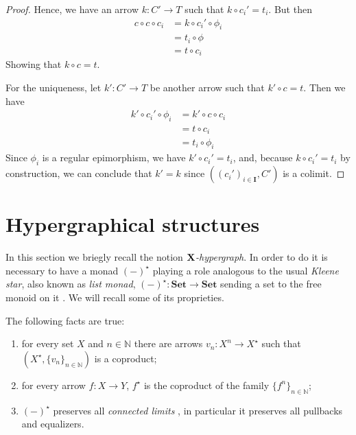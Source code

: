 \documentclass[runningheads,envcountsect]{lipics-v2021}
\newcommand{\cat}[1]{\ensuremath{\mathbf{#1}}}
\newcommand{\Set}{\mathbf{Set}}
\def\X{\textbf {\textup{X}}}
\begin{document}
\begin{proof}
    Hence, we have an arrow $k: C' \to T$ such that $k \circ c_i' = t_i$. But then
    \begin{align*}
        c \circ c \circ c_i &= k \circ c_i' \circ \phi_i \\
                            &= t_i \circ \phi \\
                            &= t \circ c_i
    \end{align*}
    Showing that $k \circ c = t$.

    For the uniqueness, let $k': C' \to T$ be another arrow such that $k' \circ c = t$. Then we have
    \begin{align*}
        k' \circ c_i' \circ \phi_i &= k' \circ c \circ c_i \\
                                   &= t \circ c_i \\
                                   &= t_i \circ \phi_i
    \end{align*}    
    Since $\phi_i$ is a regular epimorphism, we have $k' \circ c_i' = t_i$, and, because $k \circ c_i' = t_i$ by construction, we can conclude that $k'=k$ since $((c_i')_{i \in \cat I}, C')$ is a colimit.   
\end{proof}




\section{Hypergraphical structures}\label{sec:hyper}

In this section we briegly recall the notion \emph{$\X$-hypergraph}. In order to do it is necessary to have a monad $(-)^\star$ playing a role analogous to the usual \emph{Kleene star}, also known as \emph{list monad}, $(-)^\star\colon \Set\to \Set$ sending a set to the free monoid on it \cite{sakarovitch2009elements,wadler1995monads}. We will recall some of its proprieties.

\begin{proposition}
	The following facts are true:
	\begin{enumerate}
		\item for every set $X$ and $n\in \mathbb{N}$ there are arrows $v_{n}\colon X^n\to X^\star $ such that $(X^\star, \{v_{n}\}_{n\in \mathbb{N}})$ is a coproduct;
		\item for every arrow $f\colon X\to Y$, $f^\star$ is the coproduct of the family $\{f^n\}_{n\in \mathbb{N}}$;
		\item $(-)^\star$ preserves all \emph{connected limits} \cite{carboni1995connected}, in particular it preserves all pullbacks and equalizers.
	\end{enumerate}
\end{proposition}
\end{document}
